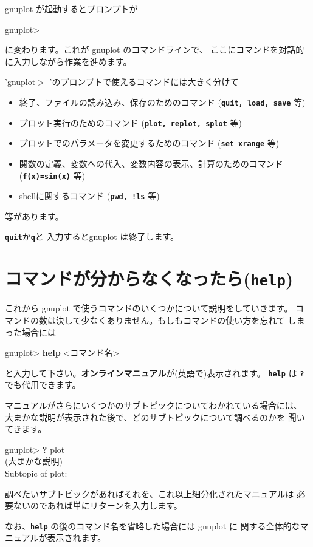 \documentclass[a4j]{ujarticle} %
\newenvironment{terminal}{%
  \begin{center}
   \begin{minipage}{.8\textwidth}
    \setlength{\FrameSep}{.5\FrameSep}%
    \begin{framed}\ttfamily\small%
     \setlength\baselineskip{.85\baselineskip}%
}{%
    \end{framed}
   \end{minipage}
  \end{center}%
}
\begin{document}
gnuplot が起動するとプロンプトが
\begin{terminal}
gnuplot>
\end{terminal}
に変わります。これが gnuplot のコマンドラインで、
ここにコマンドを対話的に入力しながら作業を進めます。

'gnuplot$>$ 'のプロンプトで使えるコマンドには大きく分けて

\begin{itemize}
\item 終了、ファイルの読み込み、保存のためのコマンド ({\tt\bf quit, load, save} 等)
\item プロット実行のためのコマンド ({\tt\bf plot, replot, splot} 等)
\item プロットでのパラメータを変更するためのコマンド ({\tt\bf set xrange} 等)
\item 関数の定義、変数への代入、変数内容の表示、計算のためのコマンド
      ({\tt\bf f(x)=sin(x)} 等)
\item shellに関するコマンド ({\tt\bf pwd, !ls} 等)
\end{itemize}

等があります。

{\tt\bf quit}か{\tt\bf q}と
入力するとgnuplot は終了します。

\section{コマンドが分からなくなったら({\tt\bf help})}
これから gnuplot で使うコマンドのいくつかについて説明をしていきます。
コマンドの数は決して少なくありません。もしもコマンドの使い方を忘れて
しまった場合には
\begin{terminal}
gnuplot> {\bf help} <コマンド名>
\end{terminal}
と入力して下さい。{\bf オンラインマニュアル}が(英語で)表示されます。
{\tt\bf help} は {\tt\bf ?} でも代用できます。

マニュアルがさらにいくつかのサブトピックについてわかれている場合には、
大まかな説明が表示された後で、どのサブトピックについて調べるのかを
聞いてきます。
\begin{terminal}
gnuplot> {\bf ?} plot \\
(大まかな説明) \\
Subtopic of plot:
\end{terminal}
調べたいサブトピックがあればそれを、これ以上細分化されたマニュアルは
必要ないのであれば単にリターンを入力します。

なお、{\tt\bf help} の後のコマンド名を省略した場合には gnuplot に
関する全体的なマニュアルが表示されます。
\end{document}
